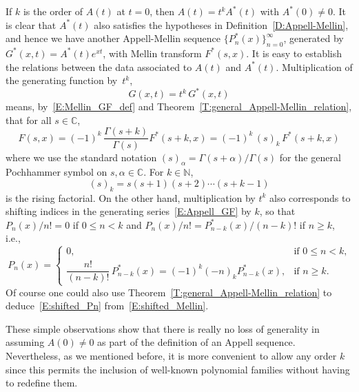 \documentclass[11pt,a4paper]{amsart}
\newcommand{\N}{\mathbb{N}}
\newcommand{\C}{\mathbb{C}}
\newcommand{\pochhammer}[2]{(#1)_{#2}}
\theoremstyle{plain}
\theoremstyle{plain}
\theoremstyle{definition}
\theoremstyle{remark}
\begin{document}
If $k$ is the order of $A(t)$ at $t = 0$, then $A(t) = t^{k} A^{*}(t)$ with $A^{*}(0) \neq 0$. It is clear that $A^{*}(t)$ also satisfies the hypotheses in Definition~\ref{D:Appell-Mellin}, and hence we have another Appell-Mellin sequence $\{P_{n}^{*}(x)\}_{n=0}^{\infty}$, generated by $G^{*}(x,t) = A^{*}(t) e^{xt}$, with Mellin transform $F^{*}(s,x)$. It is easy to establish the relations between the data associated to $A(t)$ and $A^{*}(t)$. Multiplication of the generating function by~$t^{k}$,
\[
	G(x,t) = t^{k} \, G^{*}(x,t)
\]
means, by~\eqref{E:Mellin_GF_def} and Theorem~\ref{T:general_Appell-Mellin_relation}, that for all $s \in \C$,
%
\begin{equation}
\label{E:shifted_Mellin}
	F(s,x) = (-1)^k \, \frac{\Gamma(s+k)}{\Gamma(s)} F^{*}(s+k,x)
	       = (-1)^{k} \, \pochhammer{s}{k} \, F^{*}(s+k,x)
\end{equation}
%
where we use the standard notation $(s)_{\alpha} = \Gamma(s+\alpha)/\Gamma(s)$ for the general Pochhammer symbol on $s,\alpha \in \C$. For $k \in \N$,
\[
	\pochhammer{s}{k} = s(s+1)(s+2) \cdots (s+k-1) 
\]
is the rising factorial. On the other hand, multiplication by $t^{k}$ also corresponds to shifting indices in the generating  series~\eqref{E:Appell_GF} by $k$, so that $P_{n}(x)/n! = 0$ if $0 \leq n < k$ and $P_{n}(x)/n! = P^{*}_{n-k}(x)/(n-k)!$ if $n \geq k$, i.e.,
%
\begin{equation}
\label{E:shifted_Pn}
	P_{n}(x) = \begin{cases}
	           0,                                   &\text{if $0 \leq n < k$,}
	           \\[1ex]
			     \dfrac{n!}{(n-k)!} \, P^{*}_{n-k}(x)  
			   = (-1)^{k} \pochhammer{-n}{k} P^{*}_{n-k}(x), &\text{if $n \geq k$.}
	           \end{cases}
\end{equation}
%
Of course one could also use Theorem~\ref{T:general_Appell-Mellin_relation} to deduce~\eqref{E:shifted_Pn} from~\eqref{E:shifted_Mellin}.


These simple observations show that there is really no loss of generality in assuming $A(0) \neq 0$ as part of the definition of an Appell sequence. Nevertheless, as we mentioned before, it is more convenient to allow any order $k$ since this permits the inclusion of well-known polynomial families without having to redefine them.



\end{document}
